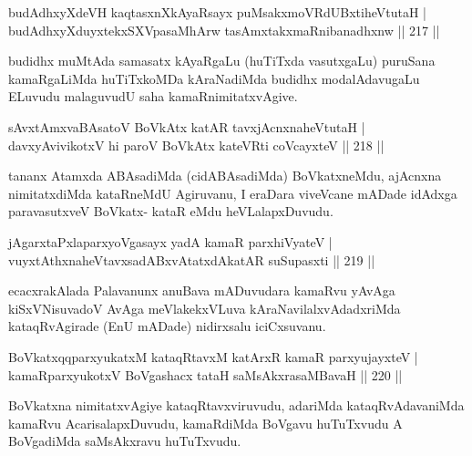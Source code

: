 \begin{shl}
budAdhxyXdeVH kaqtasxnXkAyaRsayx puMsakxmoVRdUBxtiheVtutaH |\\
budAdhxyXduyxtekxSXVpasaMhArw tasAmxtakxmaRnibanadhxnw \hfill || 217 ||
\end{shl}

\begin{artha}
budidhx muMtAda samasatx kAyaRgaLu (huTiTxda vasutxgaLu) puruSana kamaRgaLiMda huTiTxkoMDa kAraNadiMda budidhx modalAdavugaLu ELuvudu malaguvudU saha kamaRnimitatxvAgive.
\end{artha}


\begin{shl}
sAvxtAmxvaBAsatoV BoVkAtx katAR tavxjAcnxnaheVtutaH |\\
davxyAvivikotxV hi paroV BoVkAtx kateVRti coVcayxteV \hfill || 218 ||
\end{shl}

\begin{artha}
tananx Atamxda ABAsadiMda (cidABAsadiMda) BoVkatxneMdu, ajAcnxna 
nimitatxdiMda kataRneMdU Agiruvanu, I eraDara viveVcane mADade idAdxga paravasutxveV BoVkatx- kataR eMdu heVLalapxDuvudu.
\end{artha}


\begin{shl}
jAgarxtaPxlaparxyoVgasayx yadA kamaR parxhiVyateV |\\
vuyxtAthxnaheVtavxsadABxvAtatxdAkatAR suSupasxti \hfill || 219 ||
\end{shl}

\begin{artha}
ecacxrakAlada Palavanunx anuBava mADuvudara kamaRvu yAvAga kiSxVNisuvadoV AvAga meVlakekxVLuva kAraNavilalxvAdadxriMda kataqRvAgirade (EnU mADade) nidirxsalu iciCxsuvanu.
\end{artha}

\begin{shl}
BoVkatxqqparxyukatxM kataqRtavxM katArxR kamaR parxyujayxteV |\\
kamaRparxyukotxV BoVgashacx tataH saMsAkxrasaMBavaH \hfill || 220 ||
\end{shl}

\begin{artha}
BoVkatxna nimitatxvAgiye kataqRtavxviruvudu, adariMda kataqRvAdavaniMda kamaRvu AcarisalapxDuvudu, kamaRdiMda BoVgavu huTuTxvudu A BoVgadiMda saMsAkxravu huTuTxvudu.
\end{artha}

